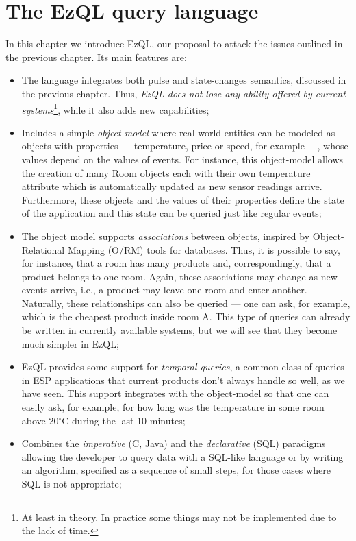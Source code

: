 \documentclass[a4,11pt]{report}
\begin{document}
\chapter{The EzQL query language}
\label{chap:ezql}

\lstset{
  language=EzQL,
  columns=fullflexible,
  basicstyle=\tt,
  keywordstyle=[1]\bf,
  keywordstyle=[2]\it,
}

In this chapter we introduce EzQL, our proposal to attack the issues
outlined in the previous chapter. Its main features are:

\begin{itemize}
\item The language integrates both pulse and state-changes semantics,
  discussed in the previous chapter. Thus, \emph{EzQL does not lose
    any ability offered by current systems}\footnote{At least in
    theory. In practice some things may not be implemented due to the
    lack of time.}, while it also adds new capabilities;
\item Includes a simple \emph{object-model} where real-world entities
  can be modeled as objects with properties --- temperature, price or
  speed, for example ---, whose values depend on the values of
  events. For instance, this object-model allows the creation of many
  Room objects each with their own temperature attribute which is
  automatically updated as new sensor readings arrive. Furthermore,
  these objects and the values of their properties define the state of
  the application and this state can be queried just like regular
  events;
\item The object model supports \emph{associations} between objects,
  inspired by Ob\-ject-Relational Mapping (O/RM) tools for
  databases. Thus, it is possible to say, for instance, that a room
  has many products and, correspondingly, that a product belongs to
  one room. Again, these associations may change as new events arrive,
  i.e., a product may leave one room and enter another. Naturally,
  these relationships can also be queried --- one can ask, for
  example, which is the cheapest product inside room A. This type of
  queries can already be written in currently available systems, but
  we will see that they become much simpler in EzQL;
\item EzQL provides some support for \emph{temporal queries}, a common
  class of queries in ESP applications that current products don't
  always handle so well, as we have seen. This support integrates with
  the object-model so that one can easily ask, for example, for how
  long was the temperature in some room above 20$^{\circ}$C during the
  last 10 minutes;
\item Combines the \emph{imperative} (C, Java) and the
  \emph{declarative} (SQL) paradigms allowing the developer to query
  data with a SQL-like language or by writing an algorithm, specified
  as a sequence of small steps, for those cases where SQL is not
  appropriate;
\end{itemize}
\end{document}
